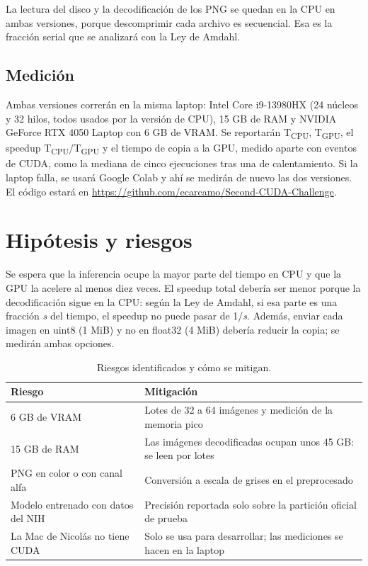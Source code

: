 \documentclass[11pt,letterpaper]{article}
\begin{document}
La lectura del disco y la decodificación de los PNG se quedan en la CPU en ambas versiones, porque descomprimir cada archivo es secuencial. Esa es la fracción serial que se analizará con la Ley de Amdahl.

\subsection{Medición}

Ambas versiones correrán en la misma laptop: Intel Core i9-13980HX (24 núcleos y 32 hilos, todos usados por la versión de CPU), 15 GB de RAM y NVIDIA GeForce RTX 4050 Laptop con 6 GB de VRAM. Se reportarán T\textsubscript{CPU}, T\textsubscript{GPU}, el speedup T\textsubscript{CPU}/T\textsubscript{GPU} y el tiempo de copia a la GPU, medido aparte con eventos de CUDA, como la mediana de cinco ejecuciones tras una de calentamiento. Si la laptop falla, se usará Google Colab y ahí se medirán de nuevo las dos versiones. El código estará en \url{https://github.com/ecarcamo/Second-CUDA-Challenge}.

\section{Hipótesis y riesgos}

Se espera que la inferencia ocupe la mayor parte del tiempo en CPU y que la GPU la acelere al menos diez veces. El speedup total debería ser menor porque la decodificación sigue en la CPU: según la Ley de Amdahl, si esa parte es una fracción \textit{s} del tiempo, el speedup no puede pasar de 1/\textit{s}. Además, enviar cada imagen en uint8 (1 MiB) y no en float32 (4 MiB) debería reducir la copia; se medirán ambas opciones.

\begin{table}[h]
\centering
\caption{Riesgos identificados y cómo se mitigan.}
\begin{tabularx}{\linewidth}{|l|X|}
\hline
Riesgo & Mitigación \\ \hline
6 GB de VRAM & Lotes de 32 a 64 imágenes y medición de la memoria pico \\ \hline
15 GB de RAM & Las imágenes decodificadas ocupan unos 45 GB: se leen por lotes \\ \hline
PNG en color o con canal alfa & Conversión a escala de grises en el preprocesado \\ \hline
Modelo entrenado con datos del NIH & Precisión reportada solo sobre la partición oficial de prueba \\ \hline
La Mac de Nicolás no tiene CUDA & Solo se usa para desarrollar; las mediciones se hacen en la laptop \\ \hline
\end{tabularx}
\end{table}
\end{document}
